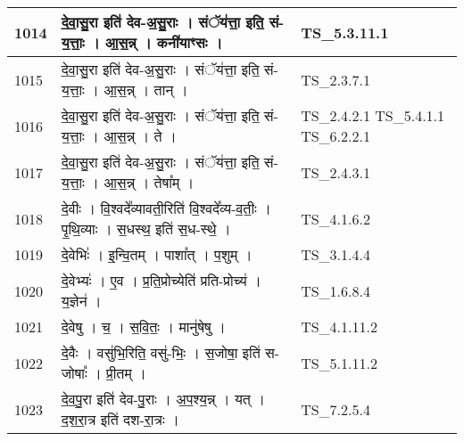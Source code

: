 \documentclass[17pt]{extarticle}
\begin{document}
\begin{longtable}{||p{0.4in}||p{4.9in}||p{0.9in}||}
    \hline
        
    1014 & दे॒वा॒सु॒रा इति॑ देव{-}अ॒सु॒राः   ।   संॅय॑त्ता॒ इति॒ सं{-}य॒त्ताः॒   ।   आ॒स॒न्न्   ।   कनी॑याꣳसः   ।    & TS\_5.3.11.1       \\
    
    \hline
        
    1015 & दे॒वा॒सु॒रा इति॑ देव{-}अ॒सु॒राः   ।   संॅय॑त्ता॒ इति॒ सं{-}य॒त्ताः॒   ।   आ॒स॒न्न्   ।   तान्   ।    & TS\_2.3.7.1       \\
    
    \hline
        
    1016 & दे॒वा॒सु॒रा इति॑ देव{-}अ॒सु॒राः   ।   संॅय॑त्ता॒ इति॒ सं{-}य॒त्ताः॒   ।   आ॒स॒न्न्   ।   ते   ।    & TS\_2.4.2.1 TS\_5.4.1.1 TS\_6.2.2.1       \\
    
    \hline
        
    1017 & दे॒वा॒सु॒रा इति॑ देव{-}अ॒सु॒राः   ।   संॅय॑त्ता॒ इति॒ सं{-}य॒त्ताः॒   ।   आ॒स॒न्न्   ।   तेषा᳚म्   ।    & TS\_2.4.3.1       \\
    
    \hline
        
    1018 & दे॒वीः   ।   वि॒श्वदे᳚व्यावती॒रिति॑ वि॒श्वदे᳚व्य{-}व॒तीः॒   ।   पृ॒थि॒व्याः   ।   स॒धस्थ॒ इति॑ स॒ध{-}स्थे॒   ।    & TS\_4.1.6.2       \\
    
    \hline
        
    1019 & दे॒वेभिः॑   ।   इ॒न्वि॒तम्   ।   पाशा᳚त्   ।   प॒शुम्   ।    & TS\_3.1.4.4       \\
    
    \hline
        
    1020 & दे॒वेभ्यः॑   ।   ए॒व   ।   प्र॒ति॒प्रोच्येति॑ प्रति{-}प्रोच्य॑   ।   य॒ज्ञेन॑   ।    & TS\_1.6.8.4       \\
    
    \hline
        
    1021 & दे॒वेषु   ।   च॒   ।   स॒वि॒तः॒   ।   मानु॑षेषु   ।    & TS\_4.1.11.2       \\
    
    \hline
        
    1022 & दे॒वैः   ।   वसु॑भि॒रिति॒ वसु॑{-}भिः॒   ।   स॒जोषा॒ इति॑ स{-}जोषाः᳚   ।   प्री॒तम्   ।    & TS\_5.1.11.2       \\
    
    \hline
        
    1023 & दे॒व॒पु॒रा इति॑ देव{-}पु॒राः   ।   अ॒प॒श्य॒न्न्   ।   यत्   ।   द॒श॒रा॒त्र इति॑ दश{-}रा॒त्रः   ।    & TS\_7.2.5.4       \\
    

\end{longtable}
\end{document}
